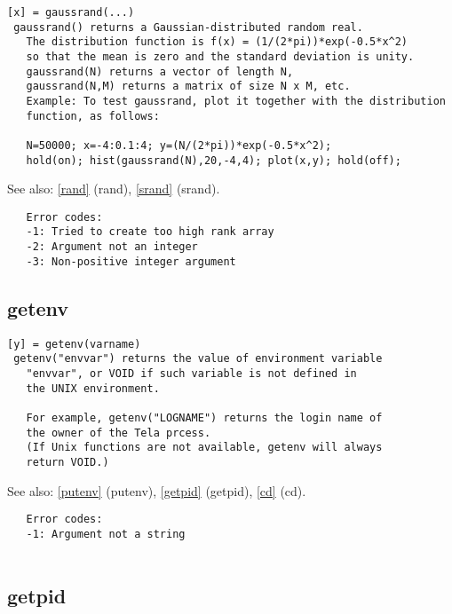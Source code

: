 \documentclass[a4paper]{article}
\begin{document}
\begin{tscreen}
\begin{verbatim}
[x] = gaussrand(...)
 gaussrand() returns a Gaussian-distributed random real.
   The distribution function is f(x) = (1/(2*pi))*exp(-0.5*x^2)
   so that the mean is zero and the standard deviation is unity.
   gaussrand(N) returns a vector of length N,
   gaussrand(N,M) returns a matrix of size N x M, etc.
   Example: To test gaussrand, plot it together with the distribution
   function, as follows:

   N=50000; x=-4:0.1:4; y=(N/(2*pi))*exp(-0.5*x^2);
   hold(on); hist(gaussrand(N),20,-4,4); plot(x,y); hold(off);
\end{verbatim}

See also: \ref{rand} {(rand)}, \ref{srand} {(srand)}.
\begin{verbatim}
   Error codes:
   -1: Tried to create too high rank array
   -2: Argument not an integer
   -3: Non-positive integer argument
\end{verbatim}
\end{tscreen}



\subsection{getenv\label{getenv}}

\begin{tscreen}
\begin{verbatim}
[y] = getenv(varname)
 getenv("envvar") returns the value of environment variable
   "envvar", or VOID if such variable is not defined in
   the UNIX environment.

   For example, getenv("LOGNAME") returns the login name of
   the owner of the Tela prcess.
   (If Unix functions are not available, getenv will always
   return VOID.)
\end{verbatim}

See also: \ref{putenv} {(putenv)}, \ref{getpid} {(getpid)}, \ref{cd} {(cd)}.
\begin{verbatim}
   Error codes:
   -1: Argument not a string
   
\end{verbatim}
\end{tscreen}



\subsection{getpid\label{getpid}}
\end{document}
